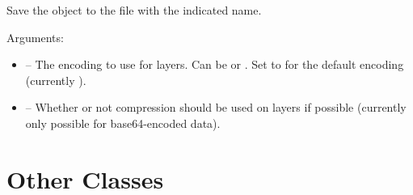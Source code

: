 \documentclass[letterpaper,10pt,english]{sphinxmanual}
\begin{document}

\begin{fulllineitems}
\label{index:tmx.TileMap.save}
Save the object to the file with the indicated name.

Arguments:
\begin{itemize}
\item {} 
 -- The encoding to use for layers.  Can be
 or .  Set to  for the
default encoding (currently ).

\item {} 
 -- Whether or not compression should be
used on layers if possible (currently only possible for
base64-encoded data).

\end{itemize}

\end{fulllineitems}



\chapter{Other Classes}
\label{index:other-classes}
\end{document}
